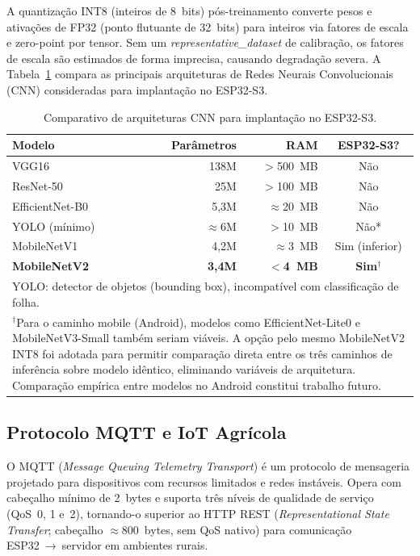 \documentclass[12pt]{article}
\begin{document}
A quantização INT8 (inteiros de 8~bits) pós-treinamento \cite{jacob2018} converte
pesos e ativações de FP32 (ponto flutuante de 32~bits) para inteiros via fatores de
escala e zero-point por tensor. Sem um
\textit{representative\_dataset} de calibração, os fatores de escala são estimados
de forma imprecisa, causando degradação severa. A Tabela~\ref{tab:modelos} compara
as principais arquiteturas de Redes Neurais Convolucionais (CNN) consideradas para
implantação no ESP32-S3.

\begin{table}[ht]
\centering
\caption{Comparativo de arquiteturas CNN para implantação no ESP32-S3.}
\label{tab:modelos}
\begin{tabular}{@{}lrrc@{}}
\toprule
\textbf{Modelo} & \textbf{Parâmetros} & \textbf{RAM} & \textbf{ESP32-S3?} \\
\midrule
VGG16           & 138M  & $>$500~MB       & Não \\
ResNet-50       & 25M   & $>$100~MB       & Não \\
EfficientNet-B0 & 5,3M  & $\approx$20~MB  & Não \\
YOLO (mínimo)   & $\approx$6M & $>$10~MB  & Não* \\
MobileNetV1     & 4,2M  & $\approx$3~MB   & Sim (inferior) \\
\textbf{MobileNetV2} & \textbf{3,4M} & \textbf{$<$4~MB} & \textbf{Sim}$^\dagger$ \\
\bottomrule
\multicolumn{4}{l}{\footnotesize *YOLO: detector de objetos (bounding box),
incompatível com classificação de folha.} \\
\multicolumn{4}{p{0.85\linewidth}}{\footnotesize $^\dagger$Para o caminho mobile
(Android), modelos como EfficientNet-Lite0 e MobileNetV3-Small também seriam
viáveis. A opção pelo mesmo MobileNetV2 INT8 foi adotada para permitir comparação
direta entre os três caminhos de inferência sobre modelo idêntico, eliminando
variáveis de arquitetura. Comparação empírica entre modelos no Android constitui
trabalho futuro.}
\end{tabular}
\end{table}

\subsection{Protocolo MQTT e IoT Agrícola}

O MQTT (\textit{Message Queuing Telemetry Transport}) \cite{oasis2019} é um
protocolo de mensageria projetado para dispositivos com recursos limitados e redes
instáveis. Opera com cabeçalho mínimo de 2~bytes e suporta três níveis de
qualidade de serviço (QoS~0, 1 e~2), tornando-o superior ao HTTP REST
(\textit{Representational State Transfer}; cabeçalho $\approx$800~bytes, sem QoS
nativo) para comunicação ESP32~→~servidor em ambientes rurais.
\end{document}

